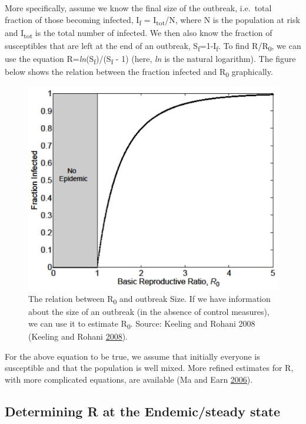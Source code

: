 \documentclass[]{book}
\theoremstyle{definition}
\theoremstyle{definition}
\theoremstyle{definition}
\theoremstyle{remark}
\begin{document}
More specifically, assume we know the final size of the outbreak,
i.e.~total fraction of those becoming infected, I\textsubscript{f} =
I\textsubscript{tot}/N, where N is the population at risk and
I\textsubscript{tot} is the total number of infected. We then also know
the fraction of susceptibles that are left at the end of an outbreak,
S\textsubscript{f}=1-I\textsubscript{f}. To find R/R\textsubscript{0},
we can use the equation
R=\emph{ln}(S\textsubscript{f})/(S\textsubscript{f} - 1) (here,
\emph{ln} is the natural logarithm). The figure below shows the relation
between the fraction infected and R\textsubscript{0} graphically.

\begin{figure}
\centering
\includegraphics{./images/outbreaksize.png}
\caption{\label{fig:outbreaksize}The relation between R\textsubscript{0} and
outbreak Size. If we have information about the size of an outbreak (in
the absence of control measures), we can use it to estimate
R\textsubscript{0}. Source: Keeling and Rohani 2008 (Keeling and Rohani
\protect\hyperlink{ref-keeling08}{2008}).}
\end{figure}

For the above equation to be true, we assume that initially everyone is
susceptible and that the population is well mixed. More refined
estimates for R, with more complicated equations, are available (Ma and
Earn \protect\hyperlink{ref-ma06}{2006}).

\hypertarget{determining-r-at-the-endemicsteady-state}{%
\subsection{Determining R at the Endemic/steady
state}\label{determining-r-at-the-endemicsteady-state}}
\end{document}
